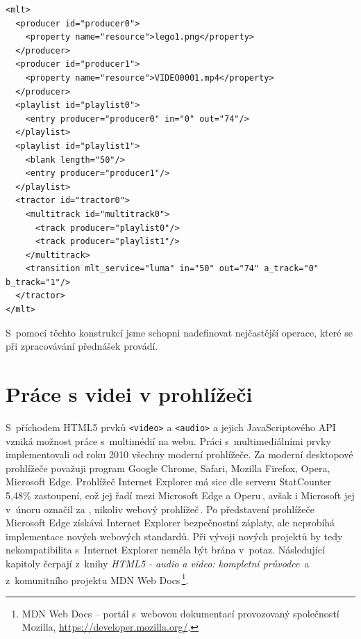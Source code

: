 \begin{lstlisting}[style=xml]
<mlt>
  <producer id="producer0">
    <property name="resource">lego1.png</property>
  </producer>
  <producer id="producer1">
    <property name="resource">VIDEO0001.mp4</property>
  </producer>
  <playlist id="playlist0">
    <entry producer="producer0" in="0" out="74"/>
  </playlist>
  <playlist id="playlist1">
    <blank length="50"/>
    <entry producer="producer1"/>
  </playlist>
  <tractor id="tractor0">
    <multitrack id="multitrack0">
      <track producer="playlist0"/>
      <track producer="playlist1"/>
    </multitrack>
    <transition mlt_service="luma" in="50" out="74" a_track="0" b_track="1"/>
  </tractor>
</mlt>
\end{lstlisting}

S~pomocí těchto konstrukcí jsme schopni nadefinovat nejčastější operace, které se při zpracovávání přednášek provádí.

\section{Práce s videi v prohlížeči}
S~příchodem HTML5 prvků \texttt{<video>} a \texttt{<audio>} a jejich JavaScriptového API vzniká možnost práce s~multimédií na webu. Práci s~multimediálními prvky implementovali od roku 2010 všechny moderní prohlížeče. Za moderní desktopové prohlížeče považuji program Google Chrome, Safari, Mozilla Firefox, Opera, Microsoft Edge. Prohlížeč Internet Explorer má sice dle serveru StatCounter 5,48\% zastoupení, což jej řadí mezi Microsoft Edge a Operu\,\cite{statcounter}, avšak i Microsoft jej v~únoru označil za , nikoliv webový prohlížeč\,\cite{internetExplorer}. Po představení prohlížeče Microsoft Edge získává Internet Explorer bezpečnostní záplaty, ale neprobíhá implementace nových webových standardů. Při vývoji nových projektů by tedy nekompatibilita s~Internet Explorer neměla být brána v~potaz. Následující kapitoly čerpají z~knihy \textit{HTML5 - audio a video: kompletní průvodce}\,\cite{HTML5multimedia} a z~komunitního projektu MDN Web Docs\,\footnote{MDN Web Docs -- portál s~webovou dokumentací provozovaný společností Mozilla, \url{https://developer.mozilla.org/}.}.

